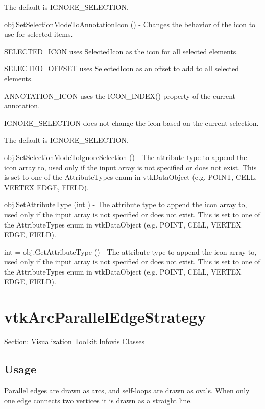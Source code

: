 \begin{DoxyItemize}
\begin{DoxyItemize}
\end{DoxyItemize}The default is I\-G\-N\-O\-R\-E\-\_\-\-S\-E\-L\-E\-C\-T\-I\-O\-N.  
\item {\ttfamily obj.\-Set\-Selection\-Mode\-To\-Annotation\-Icon ()} -\/ Changes the behavior of the icon to use for selected items. 
\begin{DoxyItemize}
\item S\-E\-L\-E\-C\-T\-E\-D\-\_\-\-I\-C\-O\-N uses Selected\-Icon as the icon for all selected elements. 
\item S\-E\-L\-E\-C\-T\-E\-D\-\_\-\-O\-F\-F\-S\-E\-T uses Selected\-Icon as an offset to add to all selected elements. 
\item A\-N\-N\-O\-T\-A\-T\-I\-O\-N\-\_\-\-I\-C\-O\-N uses the I\-C\-O\-N\-\_\-\-I\-N\-D\-E\-X() property of the current annotation. 
\item I\-G\-N\-O\-R\-E\-\_\-\-S\-E\-L\-E\-C\-T\-I\-O\-N does not change the icon based on the current selection. 
\end{DoxyItemize}The default is I\-G\-N\-O\-R\-E\-\_\-\-S\-E\-L\-E\-C\-T\-I\-O\-N.  
\item {\ttfamily obj.\-Set\-Selection\-Mode\-To\-Ignore\-Selection ()} -\/ The attribute type to append the icon array to, used only if the input array is not specified or does not exist. This is set to one of the Attribute\-Types enum in vtk\-Data\-Object (e.\-g. P\-O\-I\-N\-T, C\-E\-L\-L, V\-E\-R\-T\-E\-X E\-D\-G\-E, F\-I\-E\-L\-D).  
\item {\ttfamily obj.\-Set\-Attribute\-Type (int )} -\/ The attribute type to append the icon array to, used only if the input array is not specified or does not exist. This is set to one of the Attribute\-Types enum in vtk\-Data\-Object (e.\-g. P\-O\-I\-N\-T, C\-E\-L\-L, V\-E\-R\-T\-E\-X E\-D\-G\-E, F\-I\-E\-L\-D).  
\item {\ttfamily int = obj.\-Get\-Attribute\-Type ()} -\/ The attribute type to append the icon array to, used only if the input array is not specified or does not exist. This is set to one of the Attribute\-Types enum in vtk\-Data\-Object (e.\-g. P\-O\-I\-N\-T, C\-E\-L\-L, V\-E\-R\-T\-E\-X E\-D\-G\-E, F\-I\-E\-L\-D).  
\end{DoxyItemize}\hypertarget{vtkinfovis_vtkarcparalleledgestrategy}{}\section{vtk\-Arc\-Parallel\-Edge\-Strategy}\label{vtkinfovis_vtkarcparalleledgestrategy}
Section\-: \hyperlink{sec_vtkinfovis}{Visualization Toolkit Infovis Classes} \hypertarget{vtkwidgets_vtkxyplotwidget_Usage}{}\subsection{Usage}\label{vtkwidgets_vtkxyplotwidget_Usage}
Parallel edges are drawn as arcs, and self-\/loops are drawn as ovals. When only one edge connects two vertices it is drawn as a straight line.

